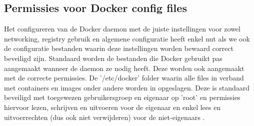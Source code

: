 \subsection{Permissies voor Docker config files}

Het configureren van de Docker daemon met de juiste instellingen voor zowel networking, registry gebruik en algemene configuratie heeft enkel nut als we ook de configuratie bestanden waarin deze instellingen worden bewaard correct beveiligd zijn. Standaard worden de bestanden die Docker gebruikt pas aangemaakt wanneer de daemon ze nodig heeft. Deze worden ook aangemaakt met de correcte permissies. De '/etc/docker' folder waarin alle files in verband met containers en images onder andere worden in opgeslagen. Deze is standaard beveiligd met toegewezen gebruikersgroep en eigenaar op 'root' en permissies hiervoor  lezen, schrijven en uitvoeren voor de eigenaar en enkel lees en uitvoerrechten (dus ook niet verwijderen) voor de niet-eigenaars \cite{Shotts2016}.
